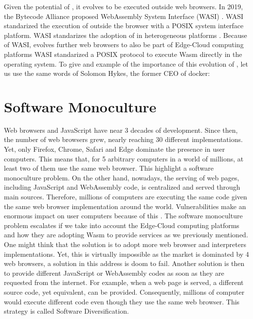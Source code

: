 Given the potential of \wasm, it evolves to be executed outside web browsers.
In 2019, the Bytecode Alliance \cite{bytecodealliance} proposed WebAssembly System Interface (WASI) \cite{WASI}. 
WASI standarized the execution of \wasm outside the browser with a POSIX system interface platform.
WASI standarizes the adoption of \wasm in heterogeneous platforms \cite{bryant2020webassembly}. 
Because of WASI, \wasm evolves further web browsers to also be part of Edge-Cloud computing platforms \cite{9640153, wen2020wasmachine}
WASI standarized a POSIX protocol to execute Wasm directly in the operating system. 
To give and example of the importance of this evolution of \wasm, let us use the same words of Solomon Hykes, the former CEO of docker: 

\vspace{0.5cm}

\begin{minipage}{0.8\linewidth}
\end{minipage}

\section{Software Monoculture}

Web browsers and JavaScript have near 3 decades of development.
Since then, the number of web browsers grew, nearly reaching 30 different implementations. 
Yet, only Firefox, Chrome, Safari and Edge dominate the presence in user computers.
This means that, for 5 arbitrary computers in a world of millions, at least two of them use the same web browser.
This highlight a software monoculture problem.
On the other hand, nowadays, the serving of web pages, including JavaScript and WebAssembly code, is centralized and served through main sources.
Therefore, millions of computers are executing the same code given the same web browser implementation around the world.
Vulnerabilities make an enormous impact on user computers because of this \citationneeded.
The software monoculture problem escalates if we take into account the Edge-Cloud computing platforms and how they are adopting Wasm to provide services as we previously mentioned.
One might think that the solution is to adopt more web browser and interpreters implementations. 
Yet, this is virtually impossible as the market is dominated by 4 web browsers, a solution in this address is doom to fail. 
Another solution is then to provide different JavaScript or WebAssembly codes as soon as they are requested from the internet. 
For example, when a web page is served, a different source code, yet equivalent, can be provided. 
Consequently, millions of computer would execute different code even though they use the same web browser.
This strategy is called Software Diversification.

